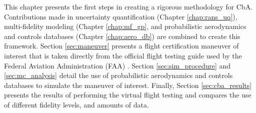 This chapter presents the first steps in creating a rigorous methodology for CbA.
Contributions made in uncertainty quantification (Chapter \ref{chap:rans_uq}), multi-fidelity modeling (Chapter \ref{chap:mf_gp}, and probabilistic aerodynamics and controls databases (Chapter \ref{chap:aero_db}) are combined to create this framework.
Section \ref{sec:maneuver} presents a flight certification maneuver of interest that is taken directly from the official flight testing guide used by the Federal Aviation Administration (FAA) \cite{romanowski_flight_2018}.
Section \ref{sec:sim_procedure} and \ref{sec:mc_analysis} detail the use of probabilistic aerodynamics and controls databases to simulate the maneuver of interest.
Finally, Section \ref{sec:cba_results} presents the results of performing the virtual flight testing and compares the use of different fidelity levels, and amounts of data. 
 